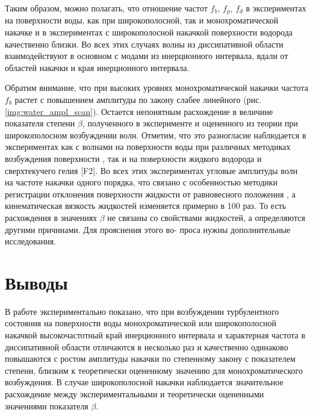 Таким образом, можно полагать, что отношение частот $f_b$, $f_p$, $f_d$ в экспериментах на поверхности воды, как при широкополосной, так и монохроматической накачке и в экспериментах с широкополосной накачкой поверхности водорода качественно близки. Во всех этих случаях волны из диссипативной области взаимодействуют в основном с модами из инерционного интервала, вдали от областей накачки и края инерционного интервала.

Обратим внимание, что при высоких уровнях монохроматической накачки частота $f_b$ растет с повышением амплитуды по закону слабее линейного (рис. \ref{img:water_ampl_scan}). Остается непонятным расхождение в величине показателя степени $\beta$, полученного в эксперименте и оцененного из теории при широкополосном возбуждении волн. Отметим, что это разногласие наблюдается в экспериментах как с волнами на поверхности воды при различных методиках возбуждения поверхности \cite{Brazhnikov_EPL}, так и на поверхности жидкого водорода \cite{Brazhnikov_liq_hydr} и сверхтекучего гелия [F2]. Во всех этих экспериментах угловые амплитуды волн на частоте накачки одного порядка, что связано с особенностью методики регистрации отклонения поверхности жидкости от равновесного положения \cite{Brazhnikov_IET}, а кинематическая вязкость жидкостей изменяется примерно в 100 раз. То есть расхождения в значениях $\beta$ не связаны со свойствами жидкостей, а определяются другими причинами. Для прояснения этого во- проса нужны дополнительные исследования.

\section{Выводы} %


В работе экспериментально показано, что при возбуждении турбулентного состояния на поверхности воды монохроматической или широкополосной накачкой высокочастотный край инерционного интервала и характерная частота в диссипативной области отличаются в несколько раз и качественно одинаково повышаются с ростом амплитуды накачки по степенному закону с показателем степени, близким к теоретически оцененному значению для монохроматического возбуждения. В случае широкополосной накачки наблюдается значительное расхождение между экспериментальными и теоретически оцененными значениями показателя $\beta$.

%
%

\clearpage

